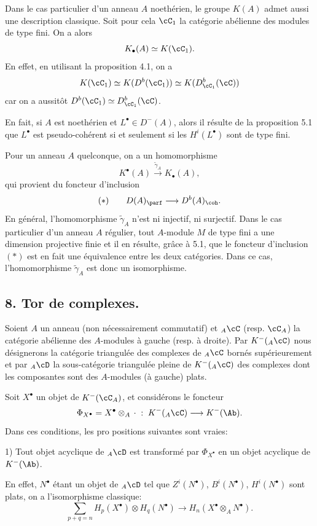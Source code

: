 Dans le cas particulier d'un anneau $A$ noethérien, le groupe $K(A)$ admet aussi une description classique. Soit pour cela $\cC_1$ la catégorie abélienne des modules de type fini. On a alors
\[
K_\bullet(A)\simeq K(\cC_1).
\]
En effet, en utilisant la proposition 4.1, on a
\[
K(\cC_1)\simeq K(D^b(\cC_1))\simeq K(D^b_{\cC_1}(\cC))
\]
car on a
aussitôt $D^b(\cC_1)\simeq D^b_{\cC_1}(\cC)$.

En fait, si $A$ est noethérien et $L^\bullet\in D^-(A)$, alors il résulte de la proposition 5.1 que $L^\bullet$ est pseudo-cohérent si et seulement si les $H^i(L^\bullet)$ sont de type fini.

Pour un anneau $A$ quelconque, on a un homomorphisme
\[
K^{\bullet}(A)\xrightarrow{\widetilde\gamma_A}K_\bullet(A),
\]
qui provient du foncteur d'inclusion
\[
(*)\qquad D(A)_{\parf}\longrightarrow D^b(A)_{\coh}.
\]
En général, l'homomorphisme $\widetilde\gamma_A$ n'est ni injectif, ni surjectif. Dans le cas particulier d'un anneau $A$ régulier, tout $A$-module $M$ de type fini a une dimension projective finie et il en résulte, grâce à 5.1, que le foncteur d'inclusion $(*)$ est en fait une équivalence entre les deux catégories. Dans ce cas, l'homomorphisme $\widetilde\gamma_A$ est donc un isomorphisme.

\subsection*{8. Tor de complexes.}

Soient $A$ un anneau (non nécessairement commutatif) et ${}_A\cC$ (resp. $\cC_A$) la catégorie abélienne des $A$-modules à gauche (resp. à droite). Par $K^-({}_A\cC)$ nous désignerons la catégorie triangulée des complexes de ${}_A\cC$ bornés supérieurement et par ${}_A\cD$ la sous-catégorie triangulée pleine de $K^-({}_A\cC)$ des complexes dont les composantes sont des $A$-modules (à gauche) plats.

Soit $X^\bullet$ un objet de $K^-(\cC_A)$, et considérons le foncteur
\[
\Phi_{X^\bullet}=X^\bullet\otimes_A\,\cdot\;:\;K^-({}_A\cC)\longrightarrow K^-(\Ab).
\]
Dans ces conditions, les
pro%
positions suivantes sont vraies:

1) Tout objet acyclique de ${}_A\cD$ est transformé par $\Phi_{X^\bullet}$ en un objet acyclique de $K^-(\Ab)$.

En effet, $N^\bullet$ étant un objet de ${}_A\cD$ tel que $Z^i(N^\bullet)$, $B^i(N^\bullet)$, $H^i(N^\bullet)$ sont plats, on a l'isomorphisme classique:
\[
\sum_{p+q=n}H_p(X^\bullet)\otimes H_q(N^\bullet)
\longrightarrow H_n(X^\bullet\otimes_A N^\bullet).
\]

